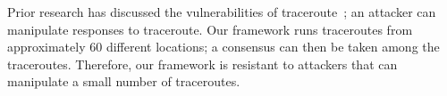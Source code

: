 Prior research has discussed the vulnerabilities of traceroute~\cite{padmanabhan2003secure}; an attacker can manipulate responses to traceroute.  Our framework runs traceroutes from approximately 60 different locations; a consensus can then be taken among the traceroutes.  Therefore, our framework is resistant to attackers that can manipulate a small number of traceroutes.  


